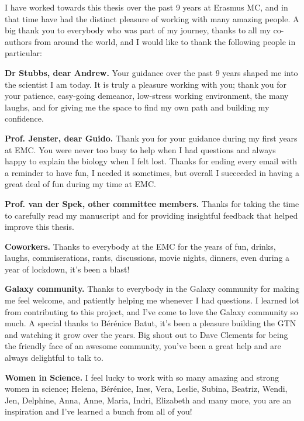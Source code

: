 
 I have worked towards this thesis over the past 9 years at Erasmus MC, and in that time have had the distinct pleasure of working with many amazing people. A big thank you to everybody who was part of my journey, thanks to all my co-authors from around the world, and I would like to thank the following people in particular:

\textbf{Dr Stubbs, dear Andrew.} Your guidance over the past 9 years shaped me into the scientist I am today. It is truly a pleasure working with you; thank you for your patience, easy-going demeanor, low-stress working environment, the many laughs, and for giving me the space to find my own path and building my confidence.

\textbf{Prof. Jenster, dear Guido.} Thank you for your guidance during my first years at EMC. You were never too busy to help when I had questions and always happy to explain the biology when I felt lost. Thanks for ending every email with a reminder to have fun, I needed it sometimes, but overall I succeeded in having a great deal of fun during my time at EMC.


\textbf{Prof. van der Spek, other committee members.} Thanks for taking the time to carefully read my manuscript and for providing insightful feedback that helped improve this thesis.

\textbf{Coworkers.} Thanks to everybody at the EMC for the years of fun, drinks, laughs, commiserations, rants, discussions, movie nights, dinners, even during a year of lockdown, it's been a blast!

\textbf{Galaxy community.} Thanks to everybody in the Galaxy community for making me feel welcome, and patiently helping me whenever I had questions. I learned lot from contributing to this project, and I've come to love the Galaxy community so much. A special thanks to Bérénice Batut, it's been a pleasure building the GTN and watching it grow over the years. Big shout out to Dave Clements for being the friendly face of an awesome community, you've been a great help and are always delightful to talk to.

\textbf{Women in Science.} I feel lucky to work with so many amazing and strong women in science; Helena, Bérénice, Ines, Vera, Leslie, Subina, Beatriz, Wendi, Jen, Delphine, Anna, Anne, Maria, Indri, Elizabeth and many more, you are an inspiration and I've learned a bunch from all of you!

